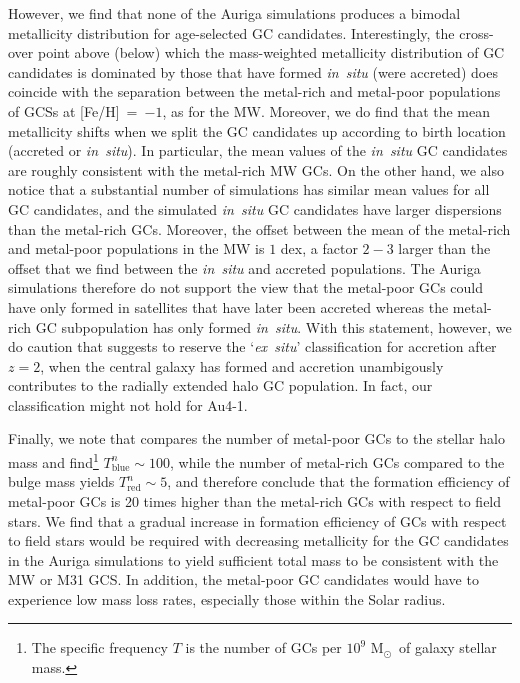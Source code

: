 \documentclass[a4paper,fleqn,usenatbib]{mnras}
\newcommand{\Sun}[0]{\ensuremath{_{\odot}}}
\begin{document}
However, we find that none of the Auriga simulations produces a bimodal 
metallicity distribution for age-selected GC candidates. Interestingly, the 
cross-over point above (below) which the mass-weighted metallicity distribution
of GC candidates is dominated by those that have formed {\it in~situ} (were
accreted) does coincide with the separation between the metal-rich and metal-poor
populations of GCSs at [Fe/H]~=~$-1$, as for the MW. Moreover, we do find 
that the mean metallicity shifts when we split the GC candidates up according 
to birth location (accreted or {\it in~situ}). In particular, the mean values of 
the {\it in~situ} GC candidates are roughly consistent with the metal-rich MW GCs.
On the other hand, we also notice that a substantial number of simulations has similar 
mean values for all GC candidates, and the simulated {\it in~situ} GC candidates 
have larger dispersions than the metal-rich GCs. Moreover, the offset between 
the mean of the metal-rich and metal-poor populations in the MW is $1$ dex, a
factor $2-3$ larger than the offset that we find between the {\it in~situ} and 
accreted populations. The Auriga simulations therefore do not support the view 
that the metal-poor GCs could have only formed in satellites that have later been 
accreted whereas the metal-rich GC subpopulation has only formed {\it in~situ}. 
With this statement, however, we do caution that \citet{2019MNRAS.486.3134K} suggests 
to reserve the `{\it ex~situ}' classification for accretion after $z=2$, when
the central galaxy has formed and accretion unambigously contributes to the
radially extended halo GC population. In fact, our classification might not hold
for Au4-1.

Finally, we note that \citet{2006ARA&A..44..193B} compares the number of metal-poor 
GCs to the stellar halo mass and find\footnote{The specific frequency $T$ is 
the number of GCs per $10^9$ M\Sun \, of galaxy stellar mass.} $T^n_{\text{blue}} \sim 100$, 
while the number of metal-rich GCs compared to the bulge mass yields 
$T^n_{\text{red}} \sim 5$, and therefore conclude that the formation efficiency
of metal-poor GCs is 20 times higher than the metal-rich GCs with respect to 
field stars. We find that a gradual increase in formation efficiency of GCs
with respect to field stars would be required with decreasing metallicity for
the GC candidates in the Auriga simulations to yield sufficient total mass to
be consistent with the MW or M31 GCS. In addition, the metal-poor GC candidates
would have to experience low mass loss rates, especially those within the Solar
radius.
\end{document}
